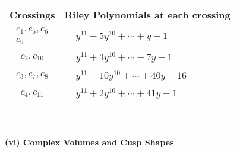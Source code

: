 \documentclass[1p]{elsarticle_modified}
\theoremstyle{definition}
\begin{document}
\begin{tabular}{m{50pt}|m{274pt}}
Crossings & \hspace{64pt}Riley Polynomials at each crossing \\
\hline $$\begin{aligned}c_{1},c_{5},c_{6}\\c_{9}\end{aligned}$$&$\begin{aligned}
&y^{11}-5 y^{10}+\cdots+y-1
\end{aligned}$\\
\hline $$\begin{aligned}c_{2},c_{10}\end{aligned}$$&$\begin{aligned}
&y^{11}+3 y^{10}+\cdots-7 y-1
\end{aligned}$\\
\hline $$\begin{aligned}c_{3},c_{7},c_{8}\end{aligned}$$&$\begin{aligned}
&y^{11}-10 y^{10}+\cdots+40 y-16
\end{aligned}$\\
\hline $$\begin{aligned}c_{4},c_{11}\end{aligned}$$&$\begin{aligned}
&y^{11}+2 y^{10}+\cdots+41 y-1
\end{aligned}$\\
\hline
\end{tabular}\\~\\
\newpage\flushleft \textbf{(vi) Complex Volumes and Cusp Shapes}
\end{document}
